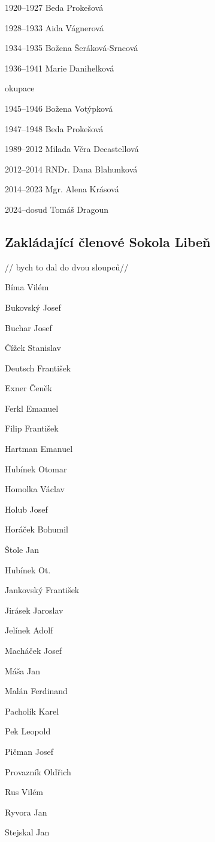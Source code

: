 \documentclass[a5paper, 11pt, twoside]{article}
\begin{document}
1920--1927 Beda Prokešová

1928--1933 Aida Vágnerová

1934--1935 Božena Šeráková-Srncová

1936--1941 Marie Danihelková

okupace

1945--1946 Božena Votýpková

1947--1948 Beda Prokešová

1989--2012 Milada Věra Decastellová

2012--2014 RNDr. Dana Blahunková

2014--2023 Mgr. Alena Krásová

2024--dosud Tomáš Dragoun

\subsection{Zakládající členové Sokola Libeň}

// bych to dal do dvou sloupců//

Bíma Vilém

Bukovský Josef

Buchar Josef

Čížek Stanislav

Deutsch František

Exner Čeněk

Ferkl Emanuel

Filip František

Hartman Emanuel

Hubínek Otomar

Homolka Václav

Holub Josef

Horáček Bohumil

Štole Jan

Hubínek Ot.

Jankovský František

Jirásek Jaroslav

Jelínek Adolf

Macháček Josef

Máša Jan

Malán Ferdinand

Pacholík Karel

Pek Leopold

Pičman Josef

Provazník Oldřich

Rus Vilém

Ryvora Jan

Stejskal Jan
\end{document}
